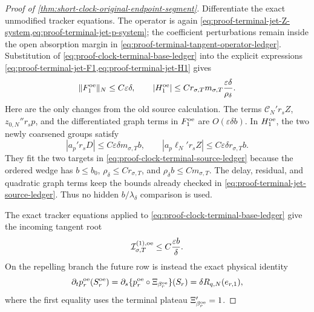 \begin{proof}[Proof of
\cref{thm:short-clock-original-endpoint-segment}]
Differentiate the exact unmodified tracker equations.  The operator is
again
\cref{eq:proof-terminal-jet-Z-system,eq:proof-terminal-jet-p-system}; the
coefficient perturbations remain inside the open absorption margin in
\cref{eq:proof-terminal-tangent-operator-ledger}.  Substitution of
\cref{eq:proof-clock-terminal-base-ledger} into the explicit expressions
\cref{eq:proof-terminal-jet-F1,eq:proof-terminal-jet-H1} gives
\begin{equation}
 \|F_1^{\rm oe}\|_N\le C\varepsilon\delta,
 \qquad
 |H_1^{\rm oe}|
 \le C r_{\sigma,T}m_{\sigma,T}
             \frac{\varepsilon\delta}{\rho_\delta}.      \label{eq:proof-clock-terminal-source-ledger}
\end{equation}
Here are the only changes from the old source calculation.  The terms
\(\mathcal C_N'r_sZ\), \(z_{0,N}''r_sp\), and the differentiated graph
terms in \(F_1^{\rm oe}\) are \(O(\varepsilon\delta b)\).  In
\(H_1^{\rm oe}\), the two newly coarsened groups satisfy
\[
 |a_p'r_sD|\le C\varepsilon\delta m_{\sigma,T}b,
 \qquad
 |a_p\ell_N'r_sZ|\le C\varepsilon\delta r_{\sigma,T}b.
\]
They fit the two targets in
\cref{eq:proof-clock-terminal-source-ledger} because the ordered wedge has
\(b\le b_0\), \(\rho_\delta\le Cr_{\sigma,T}\), and
\(\rho_\delta b\le Cm_{\sigma,T}\).  The delay, residual, and quadratic
graph terms keep the bounds already checked in
\cref{eq:proof-terminal-jet-source-ledger}.  Thus no hidden
\(b/\lambda_\delta\) comparison is used.

The exact tracker equations applied to
\cref{eq:proof-clock-terminal-base-ledger} give the incoming tangent root
\begin{equation}
 \mathcal I_{\sigma,T}^{(1),\rm oe}
 \le C\frac{\varepsilon b}{\delta}.             \label{eq:proof-clock-terminal-incoming}
\end{equation}
On the repelling branch the future row is instead the exact physical
identity
\begin{equation}
 \partial_t p_r^{\rm oe}(S_r^{\rm oe})
 =\partial_s\{p_r^{\rm oe}\circ\Xi_{\beta_r^{\rm oe}}\}(S_r)
 =\delta R_{q,N}(e_{r,1}),                     \label{eq:proof-clock-terminal-future}
\end{equation}
where the first equality uses the terminal plateau
\(\Xi_{\beta_r^{\rm oe}}'=1\).


\end{proof}
